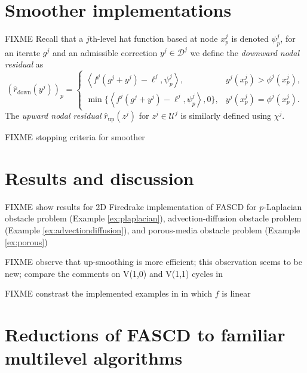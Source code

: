 \documentclass[letterpaper,final,12pt,reqno]{amsart}
\theoremstyle{cstyle}
\theoremstyle{cstyle*}
\theoremstyle{dstyle}
\numberwithin{equation}{section}
\numberwithin{figure}{section}
\numberwithin{table}{section}
\numberwithin{theorem}{section}
\newcommand{\ip}[2]{\left<#1,#2\right>}
\begin{document}
\section{Smoother implementations} \label{sec:smoothers}

FIXME  Recall that a $j$th-level hat function based at node $x_p^j$ is denoted $\psi_p^j$, for an iterate $g^j$ and an admissible correction $y^j \in \mathcal{D}^j$ we define the \emph{downward nodal residual} as
\begin{equation}
(\hat r_{\text{down}}(y^j))_p = \begin{cases} \ip{f^j(g^j+y^j)-\ell^j}{\psi_p^j}, & y^j(x_p^j) > \phi^j(x_p^j), \\
                                  \min\{\ip{f^j(g^j+y^j)-\ell^j}{\psi_p^j},0\}, & y^j(x_p^j) = \phi^j(x_p^j). \end{cases} \label{eq:dncpresidual}
\end{equation}
The \emph{upward nodal residual} $\hat r_{\text{up}}(z^j)$ for $z^j \in \mathcal{U}^j$ is similarly defined using $\chi^j$.

FIXME stopping criteria for smoother


\section{Results and discussion} \label{sec:results}

FIXME show results for 2D Firedrake implementation of FASCD for $p$-Laplacian obstacle problem (Example \ref{ex:plaplacian}), advection-diffusion obstacle problem (Example \ref{ex:advectiondiffusion}), and porous-media obstacle problem (Example \ref{ex:porous})

FIXME observe that up-smoothing is more efficient; this observation seems to be new; compare the comments on V(1,0) and V(1,1) cycles in \cite{GraeserKornhuber2009,Tai2003}

FIXME constrast the implemented examples in \cite{GraeserKornhuber2009,Tai2003} in which $f$ is linear








\appendix
\section{Reductions of FASCD to familiar multilevel algorithms} \label{app:reductions}
\end{document}
